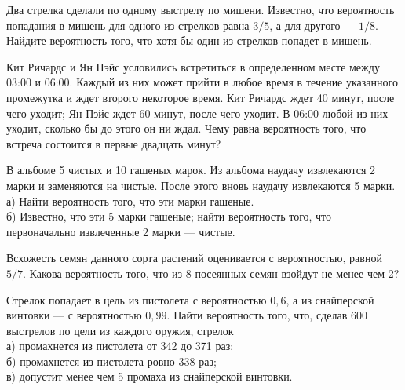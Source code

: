 \newpage\setcounter{zad}{0}



\begin{zkrW}{20}\noindent 
	Два стрелка сделали по одному выстрелу по мишени. Известно, что вероятность попадания в мишень для одного из стрелков равна $3/5$, а для другого --- $1/8$. Найдите вероятность того, что хотя бы один из стрелков попадет в мишень.
 
\end{zkrW}

\begin{zkrW}{20}\noindent 
	Кит Ричардс и Ян Пэйс условились встретиться в определенном месте между 03:00 и 06:00. Каждый из них может прийти в любое время в течение указанного промежутка и ждет второго некоторое время. Кит Ричардс ждет 40 минут, после чего уходит; Ян Пэйс ждет 60 минут, после чего уходит. В 06:00 любой из них уходит, сколько бы до этого он ни ждал. Чему равна вероятность того, что встреча состоится в первые двадцать минут?
 
\end{zkrW}

\begin{zkrW}{20}\noindent 
	В альбоме 5 чистых и 10 гашеных марок. Из альбома наудачу извлекаются 2 марки и заменяются на чистые. После этого вновь наудачу извлекаются 5 марки. \\ \indent а) Найти вероятность того, что эти марки гашеные. \\ \indent б) Известно, что эти 5 марки гашеные; найти вероятность того, что первоначально извлеченные 2 марки --- чистые.
 
\end{zkrW}

\begin{zkrW}{20}\noindent 
	Всхожесть семян данного сорта растений оценивается с вероятностью, равной $5/7$. Какова вероятность того, что из 8 посеянных семян взойдут не менее чем 2?
 
\end{zkrW}

\begin{zkrW}{20}\noindent 
	Стрелок попадает в цель из пистолета с вероятностью $0{,}6$, а из снайперской винтовки --- с вероятностью $0{,}99$. Найти вероятность того, что, сделав 600 выстрелов по цели из каждого оружия, стрелок \\ \indent а) промахнется из пистолета от 342 до 371 раз; \\ \indent б) промахнется из пистолета ровно 338 раз; \\ \indent в) допустит менее чем 5 промаха из снайперской винтовки.
 
\end{zkrW}


